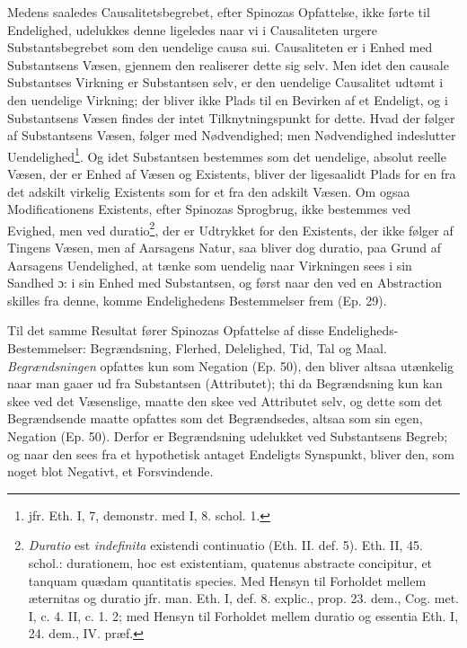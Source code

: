 \documentclass[12pt,a4paper]{book}
\newcommand{\opage}[1]{\marginnote{\footnotesize\textit{[#1]}}}
\begin{document}
Medens saaledes Causalitetsbegrebet, efter Spinozas Opfattelse, ikke
førte til Endelighed, udelukkes denne ligeledes naar vi i
Causaliteten urgere Substantsbegrebet som den uendelige causa sui.
Causaliteten er i Enhed med Substantsens Væsen, gjennem den
realiserer dette sig selv. Men
\opage{57} \setcounter{footnote}{0}%
idet den causale Substantses Virkning er Substantsen selv, er den
uendelige Causalitet udtømt i den uendelige Virkning; der bliver ikke
Plads til en Bevirken af et Endeligt, og i Substantsens Væsen findes
der intet Tilknytningspunkt for dette. Hvad der følger af Substantsens
Væsen, følger med Nødvendighed; men Nødvendighed indeslutter
Uendelighed\footnote{jfr. Eth. I, 7, demonstr. med I, 8. schol. 1.}.
Og idet Substantsen bestemmes som det uendelige, absolut reelle
Væsen, der er Enhed af Væsen og Existents, bliver der ligesaalidt
Plads for en fra det adskilt virkelig Existents som for et fra den
adskilt Væsen. Om ogsaa Modificationens Existents, efter Spinozas
Sprogbrug, ikke bestemmes ved Evighed, men ved
duratio\footnote{\emph{Duratio} est \emph{indefinita} existendi continuatio
(Eth. II. def. 5). Eth. II, 45. schol.: durationem, hoc est
existentiam, quatenus abstracte concipitur, et tanquam quædam
quantitatis species. Med Hensyn til Forholdet mellem æternitas og
duratio jfr. man. Eth. I, def. 8. explic., prop. 23. dem., Cog. met.
I, c. 4. II, c. 1. 2; med Hensyn til Forholdet mellem duratio og
essentia Eth. I, 24. dem., IV. præf.}, der er Udtrykket for den
Existents, der ikke følger af Tingens Væsen, men af Aarsagens Natur,
saa bliver dog duratio, paa Grund af Aarsagens Uendelighed, at tænke
som uendelig naar Virkningen sees i sin Sandhed ɔ: i sin Enhed med
Substantsen, og først naar den ved en Abstraction skilles fra denne,
komme Endelighedens Bestemmelser frem (Ep. 29).

Til det samme Resultat fører Spinozas Opfattelse af disse
Endeligheds-Bestemmelser: Begrændsning, Flerhed, Delelighed, Tid, Tal
og Maal. \emph{Begrændsningen} opfattes kun som Negation (Ep. 50), den
bliver altsaa utænkelig naar man gaaer ud fra Substantsen
(Attributet); thi da Begrændsning kun kan skee ved det Væsenslige,
maatte den skee ved Attributet selv, og dette som det Begrændsende
maatte opfattes som det Begrændsedes, %
altsaa som sin egen, Negation
(Ep. 50). Derfor er Begrændsning udelukket ved Substantsens Begreb; og
naar den sees fra et hypothetisk
\opage{58} antaget Endeligts Synspunkt, bliver den, som noget blot Negativt, et
Forsvindende.
\end{document}
